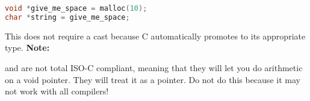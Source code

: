 \begin{lstlisting}[language=C]
void *give_me_space = malloc(10);
char *string = give_me_space;
\end{lstlisting}

This does not require a cast because C automatically promotes  to its appropriate type. \textbf{Note:}

 and  are not total ISO-C compliant, meaning that they will let you do arithmetic on a void pointer.
They will treat it as a  pointer.
Do not do this because it may not work with all compilers!


